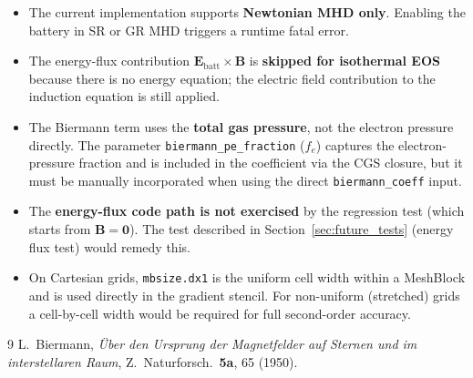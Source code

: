 \documentclass[11pt]{article}
\newcommand{\bv}[1]{\boldsymbol{#1}}
\newcommand{\Ebatt}{\bv{E}_\mathrm{batt}}
\begin{document}
\begin{itemize}
  \item The current implementation supports \textbf{Newtonian MHD only}.
        Enabling the battery in SR or GR MHD triggers a runtime fatal error.

  \item The energy-flux contribution $\Ebatt\times\bv{B}$ is \textbf{skipped
        for isothermal EOS} because there is no energy equation; the electric
        field contribution to the induction equation is still applied.

  \item The Biermann term uses the \textbf{total gas pressure}, not the
        electron pressure directly.  The parameter \texttt{biermann\_pe\_fraction}
        ($f_e$) captures the electron-pressure fraction and is included in the
        coefficient via the CGS closure, but it must be manually incorporated
        when using the direct \texttt{biermann\_coeff} input.

  \item The \textbf{energy-flux code path is not exercised} by the regression
        test (which starts from $\bv{B}=\bv{0}$).  The test described in
        Section~\ref{sec:future_tests} (energy flux test) would remedy this.

  \item On Cartesian grids, \texttt{mbsize.dx1} is the uniform cell width
        within a MeshBlock and is used directly in the gradient stencil.
        For non-uniform (stretched) grids a cell-by-cell width would be
        required for full second-order accuracy.
\end{itemize}

\begin{thebibliography}{9}
  L.~Biermann,
  \textit{\"Uber den Ursprung der Magnetfelder auf Sternen und im
  interstellaren Raum},
  Z.\ Naturforsch.\ \textbf{5a}, 65 (1950).
\end{thebibliography}
\end{document}
